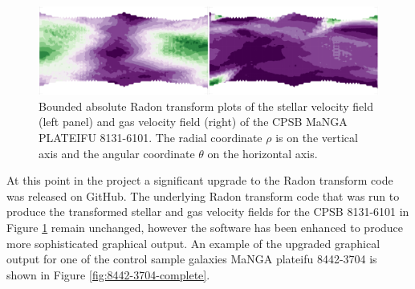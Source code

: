 \begin{figure}
    \centering
   	\includegraphics[width=\columnwidth]{images/RadonPlots/RT-snips/CPSB-8313-6101-RT-snip.png}
    \caption[Example of basic Radon transform plots for the gas and velocity fields of CPSB 8131-6101]{Bounded absolute Radon transform plots of the stellar velocity field (left panel) and gas velocity field (right) of the CPSB MaNGA PLATEIFU 8131-6101. The radial coordinate $\rho$ is on the vertical axis and the angular coordinate $\theta$ on the horizontal axis.}
    \label{fig:RT_8131-6101}
\end{figure}


At this point in the project a significant upgrade to the Radon transform code was released on GitHub. The underlying Radon transform code that was run to produce the transformed stellar and gas velocity fields for the CPSB 8131-6101 in Figure \ref{fig:RT_8131-6101} remain unchanged, however the software has been enhanced to produce more sophisticated graphical output. An example of the upgraded graphical output for one of the control sample galaxies MaNGA plateifu 8442-3704 is shown in Figure \ref{fig:8442-3704-complete}.


